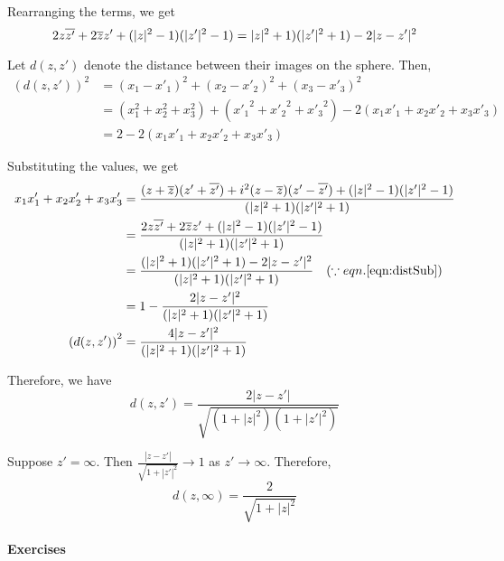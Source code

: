 \noindent Rearranging the terms, we get
\begin{equation}
	2z\overline{z'}+2\overline{z}z' + (|z|^2-1)(|{z'}|^2-1) = |z|^2+1)(|{z'}|^2+1) - 2|z-{z'}|^2
	\label{eqn:distSub}
\end{equation}

\noindent Let $d(z,z')$ denote the distance between their images on the sphere.
Then,
\begin{align*}
	\left( d(z,z') \right)^2
	& = (x_1-x'_1)^2+(x_2-x'_2)^2+(x_3-x'_3)^2 \\
	& = (x_1^2+x_2^2+x_3^2) + ({x'_1}^2+{x'_2}^2+{x'_3}^2) -2(x_1x'_1+x_2x'_2+x_3x'_3) \\
	& = 2 - 2(x_1x'_1+x_2x'_2+x_3x'_3)
\end{align*}

\noindent Substituting the values, we get
\begin{align*}
	x_1x'_1+x_2x'_2+x_3x'_3
	& = \frac{(z+\overline{z})(z'+\overline{z'}) + i^2(z-\overline{z})(z'-\overline{z'}) + (|z|^2-1)(|{z'}|^2-1) }{ (|z|^2+1)(|{z'}|^2+1) } \\
	& = \frac{2z\overline{z'}+2\overline{z}z'+(|z|^2-1)(|{z'}|^2-1)}{ (|z|^2+1)(|{z'}|^2+1) } \\
	& = \frac{(|z|^2+1)(|{z'}|^2+1)-2|{z-z'}|^2}{ (|z|^2+1)(|{z'}|^2+1) } \quad (\because eqn.\ref{eqn:distSub}) \\
	& = 1-\frac{2|{z-z'}|^2}{ (|z|^2+1)(|{z'}|^2+1) } \\
	\left( d(z,z') \right)^2
	& = \frac{4|{z-z'}|^2}{ (|z|^2+1)(|{z'}|^2+1) } 
\end{align*}

\noindent Therefore, we have
\begin{equation}
	d(z,z')= \frac{2|z-z'|}{\sqrt{(1+|z|^2)(1+|z'|^2)}}
	\label{eqn:distRiemann}
\end{equation}

Suppose $z' = \infty$.
Then $\frac{|z-z'|}{\sqrt{1+|z'|^2}} \to 1$ as $z' \to \infty$.
Therefore,
\begin{equation}
	d(z,\infty)= \frac{2}{\sqrt{1+|z|^2}}
	\label{eqn:distRiemannInfinity}
\end{equation}

\paragraph{Exercises}
